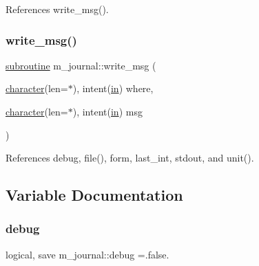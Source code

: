 References write\+\_\+msg().

\mbox{\label{namespacem__journal_a98698c251ec1883612ae40c5f2443fd9}} 
\subsubsection{\texorpdfstring{write\+\_\+msg()}{write\_msg()}}
{\footnotesize\ttfamily \hyperlink{M__stopwatch_83_8txt_acfbcff50169d691ff02d4a123ed70482}{subroutine} m\+\_\+journal\+::write\+\_\+msg (\begin{DoxyParamCaption}\item[{\hyperlink{option__stopwatch_83_8txt_abd4b21fbbd175834027b5224bfe97e66}{character}(len=$\ast$), intent(\hyperlink{M__journal_83_8txt_afce72651d1eed785a2132bee863b2f38}{in})}]{where,  }\item[{\hyperlink{option__stopwatch_83_8txt_abd4b21fbbd175834027b5224bfe97e66}{character}(len=$\ast$), intent(\hyperlink{M__journal_83_8txt_afce72651d1eed785a2132bee863b2f38}{in})}]{msg }\end{DoxyParamCaption})\hspace{0.3cm}{\ttfamily [private]}}



References debug, file(), form, last\+\_\+int, stdout, and unit().



\subsection{Variable Documentation}
\mbox{\label{namespacem__journal_a6184fbcebdfa06f0a45ce4c699189b53}} 
\subsubsection{\texorpdfstring{debug}{debug}}
{\footnotesize\ttfamily logical, save m\+\_\+journal\+::debug =.false.\hspace{0.3cm}{\ttfamily [private]}}

\mbox{\label{namespacem__journal_a4e2131bb2d66050e0a9a37632579c9fc}} 
